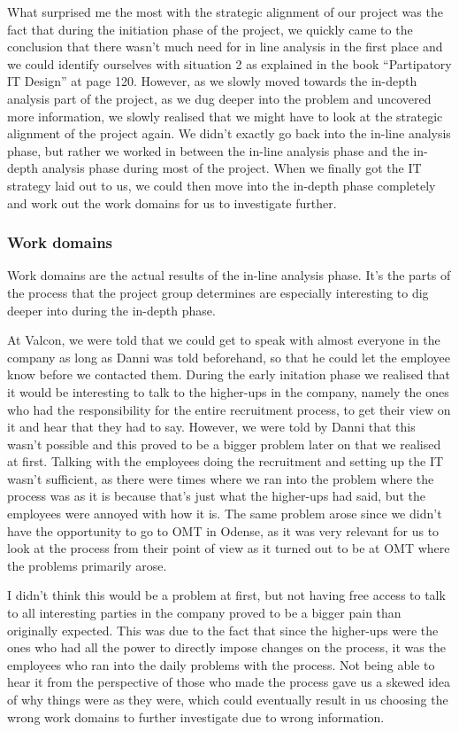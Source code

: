 What surprised me the most with the strategic alignment of our project was the fact that during the initiation phase of the project, we quickly came to the conclusion that there wasn’t much need for in line analysis in the first place and we could identify ourselves with situation 2 as explained in the book “Partipatory IT Design” at page 120. However, as we slowly moved towards the in-depth analysis part of the project, as we dug deeper into the problem and uncovered more information, we slowly realised that we might have to look at the strategic alignment of the project again.
We didn’t exactly go back into the in-line analysis phase, but rather we worked in between the in-line analysis phase and the in-depth analysis phase during most of the project. When we finally got the IT strategy laid out to us, we could then move into the in-depth phase completely and work out the work domains for us to investigate further.

\subsubsection*{Work domains}
Work domains are the actual results of the in-line analysis phase. It’s the parts of the process that the project group determines are especially interesting to dig deeper into during the in-depth phase. 

At Valcon, we were told that we could get to speak with almost everyone in the company as long as Danni was told beforehand, so that he could let the employee know before we contacted them. During the early initation phase we realised that it would be interesting to talk to the higher-ups in the company, namely the ones who had the responsibility for the entire recruitment process, to get their view on it and hear that they had to say. However, we were told by Danni that this wasn’t possible and this proved to be a bigger problem later on that we realised at first. 
Talking with the employees doing the recruitment and setting up the IT wasn’t sufficient, as there were times where we ran into the problem where the process was as it is because that’s just what the higher-ups had said, but the employees were annoyed with how it is. The same problem arose since we didn’t have the opportunity to go to OMT in Odense, as it was very relevant for us to look at the process from their point of view as it turned out to be at OMT where the problems primarily arose.

I didn’t think this would be a problem at first, but not having free access to talk to all interesting parties in the company proved to be a bigger pain than originally expected. This was due to the fact that since the higher-ups were the ones who had all the power to directly impose changes on the process, it was the employees who ran into the daily problems with the process. Not being able to hear it from the perspective of those who made the process gave us a skewed idea of why things were as they were, which could eventually result in us choosing the wrong work domains to further investigate due to wrong information.

